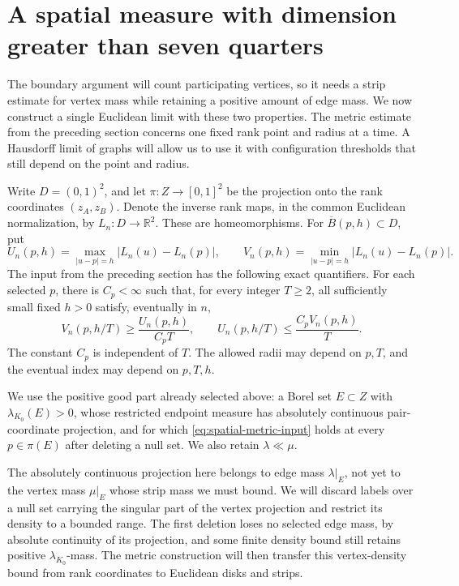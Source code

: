 \section{A spatial measure with dimension greater than seven quarters}
\label{sec:spatial}

The boundary argument will count participating vertices, so it needs a
strip estimate for vertex mass while retaining a positive amount of edge
mass. We now construct a single Euclidean limit with these two properties.
The metric estimate from the preceding section concerns one fixed rank
point and radius at a time. A Hausdorff limit of graphs will allow us to
use it with configuration thresholds that still depend on the point
and radius.

Write $D=(0,1)^2$, and let $\pi:Z\to[0,1]^2$ be the projection onto the
rank coordinates $(z_A,z_B)$.  Denote the inverse rank maps, in the common
Euclidean normalization, by $L_n:D\to\mathbb R^2$.  These are
homeomorphisms.  For $\overline B(p,h)\subset D$, put
\[
 U_n(p,h)=\max_{|u-p|=h}|L_n(u)-L_n(p)|,
 \qquad
 V_n(p,h)=\min_{|u-p|=h}|L_n(u)-L_n(p)|.
\]
The input from the preceding section has the following exact quantifiers.
For each selected $p$, there is $C_p<\infty$ such that, for every integer
$T\ge2$, all sufficiently small fixed $h>0$ satisfy, eventually in $n$,
\begin{equation}
 V_n(p,h/T)\ge\frac{U_n(p,h)}{C_pT},
 \qquad
 U_n(p,h/T)\le\frac{C_pV_n(p,h)}{T}.
 \label{eq:spatial-metric-input}
\end{equation}
The constant $C_p$ is independent of $T$.  The allowed radii may depend on
$p,T$, and the eventual index may depend on $p,T,h$.

We use the positive good part already selected above: a Borel set
$E\subset Z$ with $\lambda_{K_0}(E)>0$, whose restricted endpoint measure
has absolutely continuous pair-coordinate projection, and for which
\eqref{eq:spatial-metric-input} holds at every $p\in\pi(E)$ after deleting
a null set.  We also retain $\lambda\ll\mu$.

The absolutely continuous projection here belongs to edge mass
$\lambda|_E$, not yet to the vertex mass $\mu|_E$ whose strip mass we
must bound. We will discard labels over a null set carrying the singular
part of the vertex projection and restrict its density to a bounded
range. The first deletion loses no selected edge mass, by absolute
continuity of its projection, and some finite density bound still
retains positive $\lambda_{K_0}$-mass. The metric construction will
then transfer this vertex-density bound from
rank coordinates to Euclidean disks and strips.


